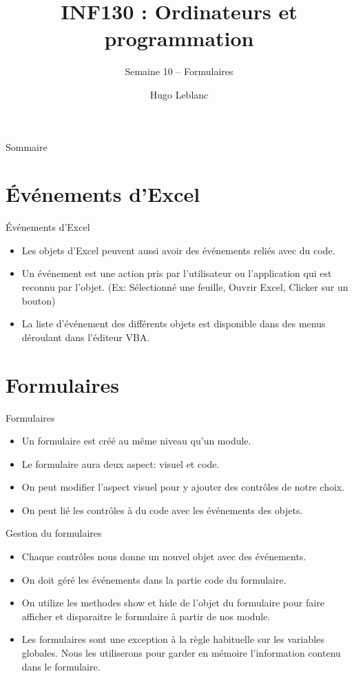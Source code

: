 \documentclass[aspectratio=169,usenames,dvipsnames]{beamer}
\title{INF130 : Ordinateurs et programmation}
\subtitle{Semaine 10 – Formulaires}
\author{Hugo Leblanc}
\begin{document}
    \maketitle

    \begin{frame}{Sommaire}
        \tableofcontents
    \end{frame}

    \section{Événements d'Excel}
    \begin{frame}{Événements d'Excel}
        \begin{itemize}
            \item Les objets d’Excel peuvent aussi avoir des événements reliés avec du code.
            \item Un événement est une action pris par l’utilisateur ou l’application qui est reconnu par l’objet. (Ex: Sélectionné une feuille, Ouvrir Excel, Clicker sur un bouton)
            \item La liste d’événement des différents objets est disponible dans des menus déroulant dans l’éditeur VBA.
        \end{itemize}
    \end{frame}
    \section{Formulaires}
    \begin{frame}{Formulaires}
        \begin{itemize}
            \item Un formulaire est créé au même niveau qu’un module.
            \item Le formulaire aura deux aspect: visuel et code.
            \item On peut modifier l’aspect visuel pour y ajouter des contrôles de notre choix.
            \item On peut lié les contrôles à du code avec les événements des objets.
        \end{itemize}
    \end{frame}
    \begin{frame}{Gestion du formulaires}
        \begin{itemize}
            \item Chaque contrôles nous donne un nouvel objet avec des événements.
            \item On doit géré les événements dans la partie code du formulaire.
            \item On utilize les methodes show et hide de l’objet du formulaire pour faire afficher et disparaitre le formulaire à partir de nos module.
            \item Les formulaires sont une exception à la règle habituelle sur les variables globales. Nous les utiliserons pour garder en mémoire l’information contenu dans le formulaire.
        \end{itemize}
    \end{frame}
\end{document}
